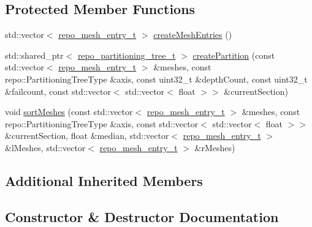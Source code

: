 \subsection*{Protected Member Functions}
\begin{DoxyCompactItemize}
\item 
std\+::vector$<$ \hyperlink{structrepo__mesh__entry__t}{repo\+\_\+mesh\+\_\+entry\+\_\+t} $>$ \hyperlink{classrepo_1_1manipulator_1_1modelutility_1_1_r_d_tree_spatial_partitioner_a86a33d1ea3b1c82606d4542d3cd82de3}{create\+Mesh\+Entries} ()
\item 
std\+::shared\+\_\+ptr$<$ \hyperlink{structrepo__partitioning__tree__t}{repo\+\_\+partitioning\+\_\+tree\+\_\+t} $>$ \hyperlink{classrepo_1_1manipulator_1_1modelutility_1_1_r_d_tree_spatial_partitioner_ad4b1863028ddec9a1e50b083a4ec656e}{create\+Partition} (const std\+::vector$<$ \hyperlink{structrepo__mesh__entry__t}{repo\+\_\+mesh\+\_\+entry\+\_\+t} $>$ \&meshes, const repo\+::\+Partitioning\+Tree\+Type \&axis, const uint32\+\_\+t \&depth\+Count, const uint32\+\_\+t \&failcount, const std\+::vector$<$ std\+::vector$<$ float $>$$>$ \&current\+Section)
\item 
void \hyperlink{classrepo_1_1manipulator_1_1modelutility_1_1_r_d_tree_spatial_partitioner_ada2a7684178144f06dfea923647ae9e8}{sort\+Meshes} (const std\+::vector$<$ \hyperlink{structrepo__mesh__entry__t}{repo\+\_\+mesh\+\_\+entry\+\_\+t} $>$ \&meshes, const repo\+::\+Partitioning\+Tree\+Type \&axis, const std\+::vector$<$ std\+::vector$<$ float $>$$>$ \&current\+Section, float \&median, std\+::vector$<$ \hyperlink{structrepo__mesh__entry__t}{repo\+\_\+mesh\+\_\+entry\+\_\+t} $>$ \&l\+Meshes, std\+::vector$<$ \hyperlink{structrepo__mesh__entry__t}{repo\+\_\+mesh\+\_\+entry\+\_\+t} $>$ \&r\+Meshes)
\end{DoxyCompactItemize}
\subsection*{Additional Inherited Members}


\subsection{Constructor \& Destructor Documentation}
\hypertarget{classrepo_1_1manipulator_1_1modelutility_1_1_r_d_tree_spatial_partitioner_a4a6e0cdf7349cb359a867c1aceb709f1}{}
